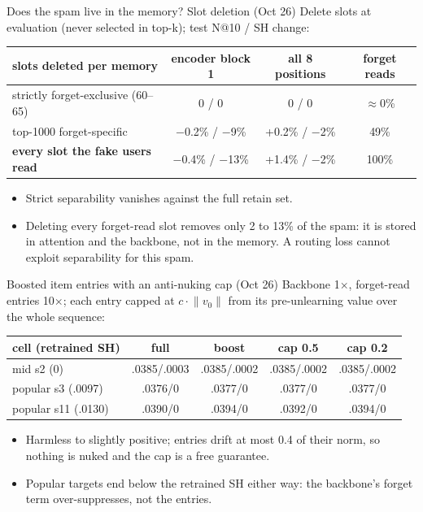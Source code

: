 \documentclass{beamer}
\begin{document}
\begin{frame}{Does the spam live in the memory? Slot deletion (Oct 26)}
Delete slots at evaluation (never selected in top-k); test N@10 / SH change:
\begin{center}
\footnotesize\setlength{\tabcolsep}{3pt}
\begin{tabular}{|l|c|c|c|}
\hline
slots deleted per memory & encoder block 1 & all 8 positions & forget reads \\
\hline
strictly forget-exclusive (60--65) & 0 / 0 & 0 / 0 & $\approx$0\% \\
top-1000 forget-specific & $-$0.2\% / $-$9\% & +0.2\% / $-$2\% & 49\% \\
\textbf{every slot the fake users read} & $-$0.4\% / $-$13\% & +1.4\% / $-$2\% & 100\% \\
\hline
\end{tabular}
\end{center}
\begin{itemize}
  \item Strict separability vanishes against the full retain set.
  \item Deleting every forget-read slot removes only 2 to 13\% of the spam: it is
        stored in attention and the backbone, not in the memory. A routing loss
        cannot exploit separability for this spam.
\end{itemize}
\end{frame}

\begin{frame}{Boosted item entries with an anti-nuking cap (Oct 26)}
Backbone 1$\times$, forget-read entries 10$\times$; each entry capped at $c \cdot
\lVert v_0 \rVert$ from its pre-unlearning value over the whole sequence:
\begin{center}
\footnotesize\setlength{\tabcolsep}{3pt}
\begin{tabular}{|l|c|c|c|c|}
\hline
cell (retrained SH) & full & boost & cap 0.5 & cap 0.2 \\
\hline
mid s2 (0)          & .0385/.0003 & .0385/.0002 & .0385/.0002 & .0385/.0002 \\
popular s3 (.0097)  & .0376/0 & .0377/0 & .0377/0 & .0377/0 \\
popular s11 (.0130) & .0390/0 & .0394/0 & .0392/0 & .0394/0 \\
\hline
\end{tabular}
\end{center}
\begin{itemize}
  \item Harmless to slightly positive; entries drift at most 0.4 of their norm,
        so nothing is nuked and the cap is a free guarantee.
  \item Popular targets end below the retrained SH either way: the backbone's
        forget term over-suppresses, not the entries.
\end{itemize}
\end{frame}
\end{document}
